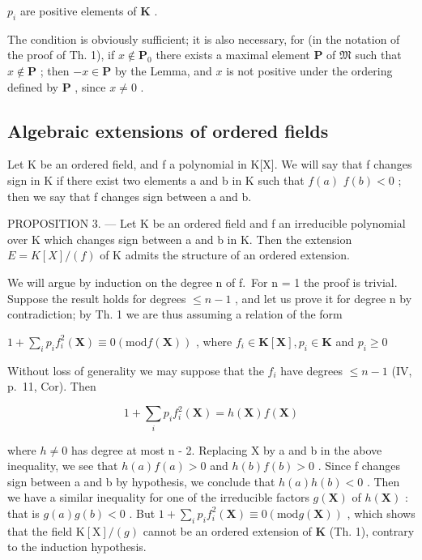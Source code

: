 \(p_i\) are positive elements of \(\mathbf{K}\) .

The condition is obviously sufficient; it is also necessary, for (in the notation of the proof of Th. 1), if \(x \notin \mathbf{P}_0\) there exists a maximal element \(\mathbf{P}\) of \(\mathfrak{M}\) such that \(x \notin \mathbf{P}\) ; then \(-x \in \mathbf{P}\) by the Lemma, and \(x\) is not positive under the ordering defined by \(\mathbf{P}\) , since \(x \neq 0\) .

\subsection{Algebraic extensions of ordered fields}

Let K be an ordered field, and f a polynomial in K{[}X{]}. We will say that f changes sign in K if there exist two elements a and b in K such that \(f(a)\) \(f(b) < 0\) ; then we say that f changes sign between a and b.

PROPOSITION 3. --- Let K be an ordered field and f an irreducible polynomial over K which changes sign between a and b in K. Then the extension \(E = K[X]/(f)\) of K admits the structure of an ordered extension.

We will argue by induction on the degree n of f.~For n = 1 the proof is trivial. Suppose the result holds for degrees \(\leqslant n - 1\) , and let us prove it for degree n by contradiction; by Th. 1 we are thus assuming a relation of the form

\(1 + \sum_{i}p_{i}f_{i}^{2}(\mathbf{X})\equiv 0 (\mathrm{mod} f(\mathbf{X}))\) , where \(f_{i}\in \mathbf{K}[\mathbf{X}], p_{i}\in \mathbf{K}\) and \(p_i\geqslant 0\)

Without loss of generality we may suppose that the \(f_{i}\) have degrees \(\leqslant n - 1\) (IV, p.~11, Cor). Then

\[
1 + \sum_ {i} p _ {i} f _ {i} ^ {2} (\mathbf {X}) = h (\mathbf {X}) f (\mathbf {X})
\]

where \(h \neq 0\) has degree at most n - 2. Replacing X by a and b in the above inequality, we see that \(h(a) f(a) > 0\) and \(h(b) f(b) > 0\) . Since f changes sign between a and b by hypothesis, we conclude that \(h(a) h(b) < 0\) . Then we have a similar inequality for one of the irreducible factors \(g(\mathbf{X})\) of \(h(\mathbf{X})\) : that is \(g(a)g(b) < 0\) . But \(1 + \sum_{i}p_{i}f_{i}^{2}(\mathbf{X})\equiv 0 (\mathrm{mod} g(\mathbf{X}))\) , which shows that the field \(\mathrm{K}[\mathrm{X}] / (g)\) cannot be an ordered extension of \(\mathbf{K}\) (Th. 1), contrary to the induction hypothesis.

